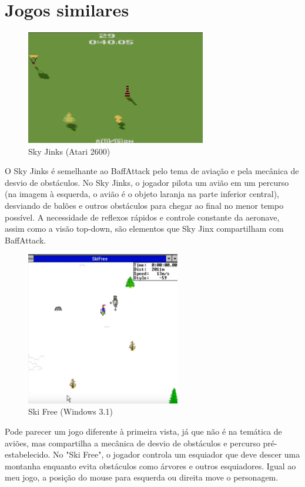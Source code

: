 \chapter{Jogos similares}
\begin{figure}[h]
    \centering
    \includegraphics[width=0.7\textwidth]{sky-jinx.png}
    \caption{Sky Jinks (Atari 2600)\cite{jinks}}
\end{figure}
O Sky Jinks é semelhante ao BaffAttack pelo tema de aviação e pela mecânica de desvio de obstáculos. No Sky Jinks, o jogador pilota um avião em um percurso (na imagem à esquerda, o avião é o objeto laranja na parte inferior central), desviando de balões e outros obstáculos para chegar ao final no menor tempo possível. A necessidade de reflexos rápidos e controle constante da aeronave, assim como a visão top-down, são elementos que Sky Jinx compartilham com BaffAttack.

\begin{figure}[h]
    \centering
    \includegraphics[width=0.6\textwidth]{ski-free.png}
    \caption{Ski Free (Windows 3.1)\cite{ski}}
\end{figure}
Pode parecer um jogo diferente à primeira vista, já que não é na temática de aviões, mas compartilha a mecânica de desvio de obstáculos e percurso pré-estabelecido. No "Ski Free", o jogador controla um esquiador que deve descer uma montanha enquanto evita obstáculos como árvores e outros esquiadores. Igual ao meu jogo, a posição do mouse para esquerda ou direita move o personagem.

